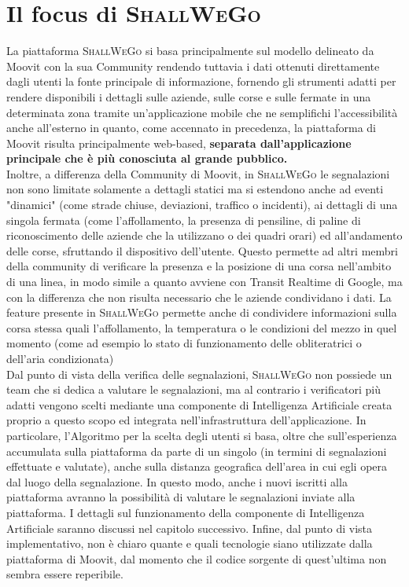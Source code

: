        

\newpage
\section{Il focus di \textsc{ShallWeGo}}
    La piattaforma \textsc{ShallWeGo} si basa principalmente sul modello delineato da Moovit con la sua Community rendendo tuttavia i dati ottenuti direttamente dagli utenti la fonte principale di informazione, fornendo gli strumenti adatti per rendere disponibili i dettagli sulle aziende, sulle corse e sulle fermate in una determinata zona tramite un'applicazione mobile che ne semplifichi l'accessibilità anche all'esterno in quanto, come accennato in precedenza, la piattaforma di Moovit risulta principalmente web-based, \textbf{separata dall'applicazione principale che è più conosciuta al grande pubblico.} \\
    Inoltre, a differenza della Community di Moovit, in \textsc{ShallWeGo} le segnalazioni non sono limitate solamente a dettagli statici ma si estendono anche ad eventi "dinamici" (come strade chiuse, deviazioni, traffico o incidenti), ai dettagli di una singola fermata (come l'affollamento, la presenza di pensiline, di paline di riconoscimento delle aziende che la utilizzano o dei quadri orari) ed all'andamento delle corse, sfruttando il dispositivo dell'utente. Questo permette ad altri membri della community di verificare la presenza e la posizione di una corsa nell'ambito di una linea, in modo simile a quanto avviene con Transit Realtime di Google, ma con la differenza che non risulta necessario che le aziende condividano i dati. La feature presente in \textsc{ShallWeGo} permette anche di condividere informazioni sulla corsa stessa quali l'affollamento, la temperatura o le condizioni del mezzo in quel momento (come ad esempio lo stato di funzionamento delle obliteratrici o dell'aria condizionata) \\
    Dal punto di vista della verifica delle segnalazioni, \textsc{ShallWeGo} non possiede un team che si dedica a valutare le segnalazioni, ma al contrario i verificatori più adatti vengono scelti mediante una componente di Intelligenza Artificiale creata proprio a questo scopo ed integrata nell'infrastruttura dell'applicazione. In particolare, l'Algoritmo per la scelta degli utenti si basa, oltre che sull'esperienza accumulata sulla piattaforma da parte di un singolo (in termini di segnalazioni effettuate e valutate), anche sulla distanza geografica dell'area in cui egli opera dal luogo della segnalazione. In questo modo, anche i nuovi iscritti alla piattaforma avranno la possibilità di valutare le segnalazioni inviate alla piattaforma. I dettagli sul funzionamento della componente di Intelligenza Artificiale saranno discussi nel capitolo successivo. Infine, dal punto di vista implementativo, non è chiaro quante e quali tecnologie siano utilizzate dalla piattaforma di Moovit, dal momento che il codice sorgente di quest'ultima non sembra essere reperibile.